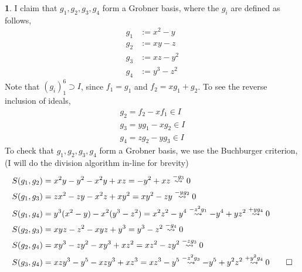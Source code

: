 \documentclass[11pt]{article}
\theoremstyle{definition}
\newtheorem{pb}{}
\begin{document}
    \begin{pb}
        I claim that \(g_1,g_2,g_3,g_4\) form a Grobner basis, where the \(g_i\) are defined as follows,
        \begin{align*}
            g_1 &:= x^2 - y \\
            g_2 &:= xy - z \\
            g_3 &:= xz - y^2 \\
            g_4 &:= y^3 - z^2 
        \end{align*}
        Note that \((g_i)_1^6 \supset I\), since \(f_1 = g_1\) and \(f_2 = xg_1 + g_2\). To see the reverse inclusion of ideals,
        \begin{align*}
            g_2 = f_2 - xf_1 \in I \\
            g_3 = yg_1 - xg_2 \in I \\
            g_4 = zg_2 - yg_3 \in I
        \end{align*}
        To check that \(g_1,g_2,g_3,g_4\) form a Grobner basis, we use the Buchburger criterion, (I will do the division algorithm in-line for brevity)
        \begin{align*}
            S(g_1,g_2) &= x^2y-y^2-x^2y+xz = -y^2 + xz \overset{-g_3}{\rightsquigarrow} 0 \\
            S(g_1,g_3) &= zx^2 - zy -x^2z + xy^2 = xy^2 - zy \overset{-yg_2}{\rightsquigarrow} 0 \\
            S(g_1,g_4) &= y^3(x^2 - y) - x^2(y^3 - z^2) = x^2z^2 - y^4 \overset{-z^2g_1}{\rightsquigarrow} -y^4 + yz^2 \overset{+yg_4}{\rightsquigarrow} 0 \\
            S(g_2,g_3) &= xyz - z^2 - xyz + y^3 = y^3 - z^2 \overset{-g_4}{\rightsquigarrow} 0 \\
            S(g_2,g_4) &= xy^3 - zy^2 - xy^3 + xz^2 = xz^2 - zy^2 \overset{-zg_3}{\rightsquigarrow} 0 \\
            S(g_3,g_4) &= xzy^3 - y^5 - xzy^3 + xz^3 = xz^3 - y^5 \overset{-z^2g_3}{\rightsquigarrow} -y^5 + y^2z^2 \overset{+y^2g_4}{\rightsquigarrow} 0 \qed
        \end{align*}
    \end{pb}
\end{document}
